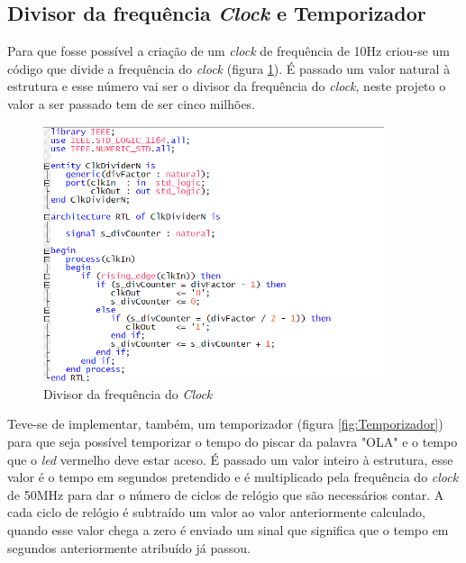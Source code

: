 \documentclass{report}
\begin{document}
\newpage

\subsection{Divisor da frequência \textit{Clock} e Temporizador}

Para que fosse possível a criação de um \textit{clock} de frequência de 10Hz criou-se um código que divide a frequência do \textit{clock} (figura \ref{fig:ClockDivider}). É passado um valor natural à estrutura e esse número vai ser o divisor da frequência do \textit{clock}, neste projeto o valor a ser passado tem de ser cinco milhões.

\begin{figure}[H]
    \centering
    \includegraphics[width = 10cm]{Clockdivider.png}
    \caption{Divisor da frequência do \textit{Clock}}
    \label{fig:ClockDivider}
\end{figure}

Teve-se de implementar, também, um temporizador (figura \ref{fig:Temporizador}) para que seja possível temporizar o tempo do piscar da palavra "OLA" e o tempo que o \textit{led} vermelho deve estar aceso. É passado um valor inteiro à estrutura, esse valor é o tempo em segundos pretendido e é multiplicado pela frequência do \textit{clock} de 50MHz para dar o número de ciclos de relógio que são necessários contar. A cada ciclo de relógio é subtraído um valor ao valor anteriormente calculado, quando esse valor chega a zero é enviado um sinal que significa que o tempo em segundos anteriormente atribuído já passou.
\end{document}
